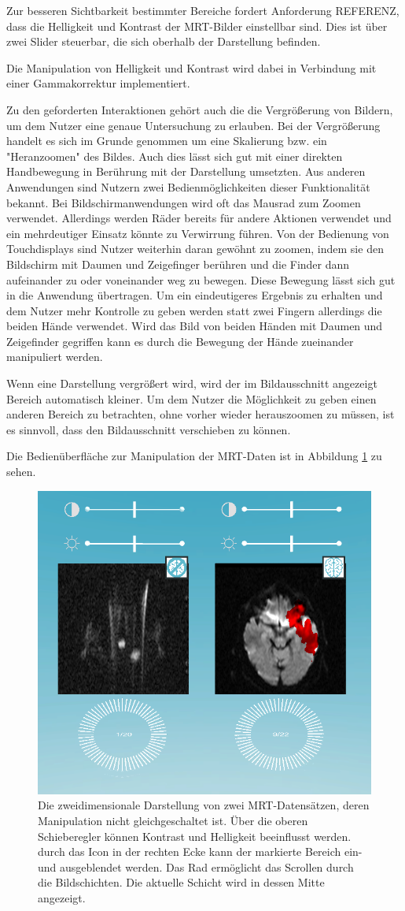 Zur besseren Sichtbarkeit bestimmter Bereiche fordert Anforderung REFERENZ, dass die Helligkeit und Kontrast der MRT-Bilder einstellbar sind. Dies ist über zwei Slider steuerbar, die sich oberhalb der Darstellung befinden. 

Die Manipulation von Helligkeit und Kontrast wird dabei in Verbindung mit einer Gammakorrektur implementiert.

Zu den geforderten Interaktionen gehört auch die die Vergrößerung von Bildern, um dem Nutzer eine genaue Untersuchung zu erlauben. Bei der Vergrößerung handelt es sich im Grunde genommen um eine Skalierung bzw. ein "Heranzoomen" des Bildes. Auch dies lässt sich gut mit einer direkten Handbewegung in Berührung mit der Darstellung umsetzten. Aus anderen Anwendungen sind Nutzern zwei Bedienmöglichkeiten dieser Funktionalität bekannt. Bei Bildschirmanwendungen wird oft das Mausrad zum Zoomen verwendet. Allerdings werden Räder bereits für andere Aktionen verwendet und ein mehrdeutiger Einsatz könnte zu Verwirrung führen. Von der Bedienung von Touchdisplays sind Nutzer weiterhin daran gewöhnt zu zoomen, indem sie den Bildschirm mit Daumen und Zeigefinger berühren und die Finder dann aufeinander zu oder voneinander weg zu bewegen. Diese Bewegung lässt sich gut in die Anwendung übertragen. Um ein eindeutigeres Ergebnis zu erhalten und dem Nutzer mehr Kontrolle zu geben werden statt zwei Fingern allerdings die beiden Hände verwendet. Wird das Bild von beiden Händen mit Daumen und Zeigefinder gegriffen kann es durch die Bewegung der Hände zueinander manipuliert werden.

Wenn eine Darstellung vergrößert wird, wird der im Bildausschnitt angezeigt Bereich automatisch kleiner. Um dem Nutzer die Möglichkeit zu geben einen anderen Bereich zu betrachten, ohne vorher wieder herauszoomen zu müssen, ist es sinnvoll, dass den Bildausschnitt verschieben zu können. 


Die Bedienüberfläche zur Manipulation der MRT-Daten ist in Abbildung \ref{img:mARt2d} zu sehen.

\begin{figure}
	\centering
	\includegraphics[width=0.5\linewidth]{images/mARt2d.png}
	\caption{Die zweidimensionale Darstellung von zwei MRT-Datensätzen, deren Manipulation nicht gleichgeschaltet ist. Über die oberen Schieberegler können Kontrast und Helligkeit beeinflusst werden. durch das Icon in der rechten Ecke kann der markierte Bereich ein- und ausgeblendet werden. Das Rad ermöglicht das Scrollen durch die Bildschichten. Die aktuelle Schicht wird in dessen Mitte angezeigt. }
	\label{img:mARt2d}
\end{figure}


